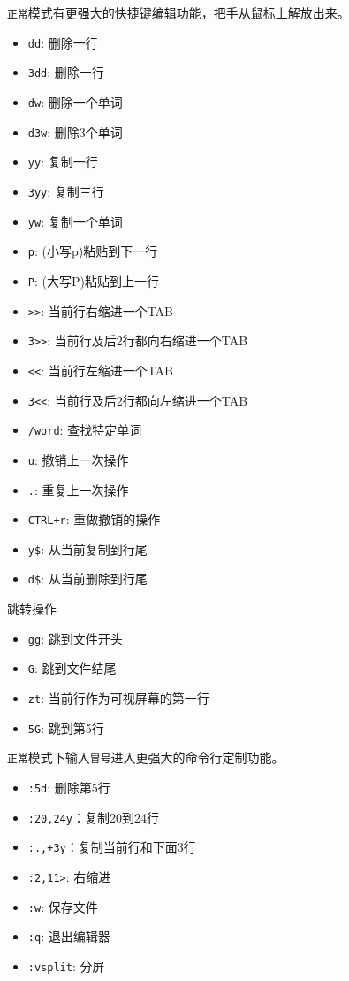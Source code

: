 \documentclass[]{article}
\providecommand{\tightlist}{%
  \setlength{\itemsep}{0pt}\setlength{\parskip}{0pt}}
\numberwithin{figure}{section}
\numberwithin{table}{section}
\begin{document}
\texttt{正常}模式有更强大的快捷键编辑功能，把手从鼠标上解放出来。

\begin{itemize}
\item
  \texttt{dd}: 删除一行
\item
  \texttt{3dd}: 删除一行
\item
  \texttt{dw}: 删除一个单词
\item
  \texttt{d3w}: 删除3个单词
\item
  \texttt{yy}: 复制一行
\item
  \texttt{3yy}: 复制三行
\item
  \texttt{yw}: 复制一个单词
\item
  \texttt{p}: (小写p)粘贴到下一行
\item
  \texttt{P}: (大写P)粘贴到上一行
\item
  \texttt{\textgreater{}\textgreater{}}: 当前行右缩进一个TAB
\item
  \texttt{3\textgreater{}\textgreater{}}: 当前行及后2行都向右缩进一个TAB
\item
  \texttt{\textless{}\textless{}}: 当前行左缩进一个TAB
\item
  \texttt{3\textless{}\textless{}}: 当前行及后2行都向左缩进一个TAB
\item
  \texttt{/word}: 查找特定单词
\item
  \texttt{u}: 撤销上一次操作
\item
  \texttt{.}: 重复上一次操作
\item
  \texttt{CTRL+r}: 重做撤销的操作
\item
  \texttt{y\$}: 从当前复制到行尾
\item
  \texttt{d\$}: 从当前删除到行尾
\end{itemize}

跳转操作

\begin{itemize}
\tightlist
\item
  \texttt{gg}: 跳到文件开头
\item
  \texttt{G}: 跳到文件结尾
\item
  \texttt{zt}: 当前行作为可视屏幕的第一行
\item
  \texttt{5G}: 跳到第5行
\end{itemize}

\texttt{正常}模式下输入\texttt{冒号}进入更强大的命令行定制功能。

\begin{itemize}
\item
  \texttt{:5d}: 删除第5行
\item
  \texttt{:20,24y}：复制20到24行
\item
  \texttt{:.,+3y}：复制当前行和下面3行
\item
  \texttt{:2,11\textgreater{}}: 右缩进
\item
  \texttt{:w}: 保存文件
\item
  \texttt{:q}: 退出编辑器
\item
  \texttt{:vsplit}: 分屏
\end{itemize}
\end{document}
